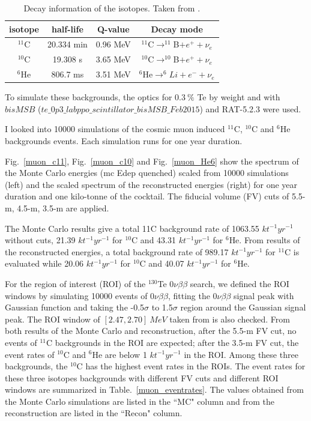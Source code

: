 \begin{table}[ht]
	\caption{Decay information of the isotopes. Taken from \cite{nndc}.}\label{decayIso}
	\centering	
	\begin{tabular*}{100mm}{c@{\extracolsep{\fill}}ccc}
		\toprule 
		isotope &half-life & Q-value &  Decay mode\\
		\midrule
		$^{11}$C & 20.334 min & 0.96 MeV&  $^{11}$C$\to ^{11}$B$+e^++\nu_e$\\
		$^{10}$C & 19.308 s & 3.65 MeV & $^{10}$C$\to^{10}$B$+e^+ +\nu_e$\\
		$^{6}$He &806.7 ms & 3.51 MeV &  $^{6}$He$\to^{6}Li+e^-+\nu_e$\\
		\bottomrule	
	\end{tabular*}
\end{table}  



To simulate these backgrounds, the optics for $0.3~\%$ Te by weight and with $bisMSB$ ($te\_0p3\_labppo\_scintillator\_bisMSB\_Feb2015$)
and RAT-5.2.3 were used.



I looked into 10000 simulations of the cosmic muon induced $^{11}$C, $^{10}$C and $^6$He backgrounds events. Each simulation runs for one
year duration.

Fig.~\ref{muon_c11}, Fig.~\ref{muon_c10} and Fig.~\ref{muon_He6} show the spectrum of the Monte Carlo energies (mc Edep quenched) scaled from 10000 simulations
(left) and the scaled spectrum of the reconstructed energies (right) for one year duration and one kilo-tonne of the
cocktail. The fiducial volume (FV) cuts of 5.5-m, 4.5-m, 3.5-m are applied.

The Monte Carlo results give a total 11C background rate of 1063.55 $kt^{-1}yr^{-1}$ without cuts, 21.39 $kt^{-1}yr^{-1}$ for
$^{10}$C and 43.31 $kt^{-1}yr^{-1}$ for $^6$He.
From results of the reconstructed energies, a total background rate of 989.17 $kt^{-1}yr^{-1}$ for $^{11}$C is evaluated while
20.06 $kt^{-1}yr^{-1}$ for $^{10}$C and 40.07 $kt^{-1}yr^{-1}$ for $^6$He.

For the region of interest (ROI) of the $^{130}$Te $0\nu\beta\beta$ search, we defined the ROI windows by simulating 10000 events of $0\nu\beta\beta$,
fitting the $0\nu\beta\beta$ signal peak with Gaussian function and taking the -0.5$\sigma$ to 1.5$\sigma$ region around the Gaussian signal
peak. The ROI window of $[2.47, 2.70]~MeV$ taken from \cite{whitepaper} is also checked. From both
results of the Monte Carlo and reconstruction, after the 5.5-m FV cut, no events of $^{11}$C backgrounds in the ROI are
expected; after the 3.5-m FV cut, the event rates of $^{10}$C and $^6$He are below 1 $kt^{-1}yr^{-1}$ in the ROI. Among these
three backgrounds, the $^{10}$C has the highest event rates in the ROIs.
The event rates for these three isotopes backgrounds with different FV cuts and different ROI windows are
summarized in Table.~\ref{muon_eventrates}. The values obtained from the Monte Carlo simulations are listed in the ``MC" column and
from the reconstruction are listed in the ``Recon" column.

